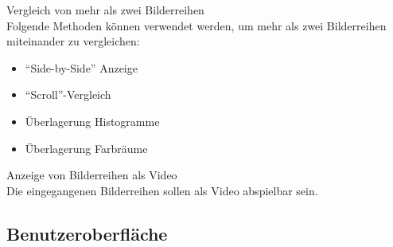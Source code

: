 \begin{speclist}[F]
\spec Vergleich von mehr als zwei Bilderreihen \\
Folgende Methoden können verwendet werden, um mehr als zwei Bilderreihen miteinander zu vergleichen:
\begin{itemize}
	\item "`Side-by-Side"' Anzeige
	\item "`Scroll"'-Vergleich
	\item Überlagerung Histogramme
	\item Überlagerung Farbräume
\end{itemize}

\spec Anzeige von Bilderreihen als Video \\
Die eingegangenen Bilderreihen sollen als Video abspielbar sein.

\end{speclist}

\subsection{Benutzeroberfläche}

